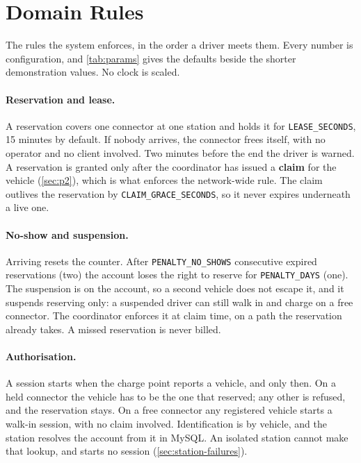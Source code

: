 \section{Domain Rules}
\label{sec:domain-rules}

The rules the system enforces, in the order a driver meets them. Every number is
configuration, and \cref{tab:params} gives the defaults beside the shorter demonstration
values. No clock is scaled.

\paragraph{Reservation and lease.} A reservation covers one connector at one station and
holds it for \texttt{LEASE\_SECONDS}, 15 minutes by default. If nobody arrives, the
connector frees itself, with no operator and no client involved. Two minutes before the end
the driver is warned. A reservation is granted only after the coordinator has issued
a \textbf{claim} for the vehicle (\cref{sec:p2}), which is what enforces the network-wide
rule. The claim outlives the reservation by \texttt{CLAIM\_GRACE\_SECONDS}, so it never
expires underneath a live one.

\paragraph{No-show and suspension.} Arriving resets the counter. After
\texttt{PENALTY\_NO\_SHOWS} consecutive expired reservations (two) the account loses the
right to reserve for \texttt{PENALTY\_DAYS} (one). The suspension is on the account, so a
second vehicle does not escape it, and it suspends reserving only: a suspended driver can
still walk in and charge on a free connector. The coordinator enforces it at claim time, on
a path the reservation already takes. A missed reservation is never billed.

\paragraph{Authorisation.} A session starts when the charge point reports a vehicle, and
only then. On a held connector the vehicle has to be the one that reserved; any other is
refused, and the reservation stays. On a free connector any registered vehicle starts a
walk-in session, with no claim involved. Identification is by vehicle, and the station
resolves the account from it in MySQL. An isolated station cannot make that lookup, and
starts no session (\cref{sec:station-failures}).

